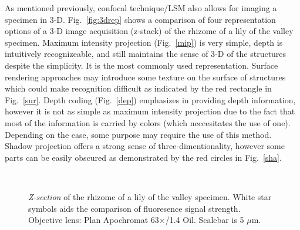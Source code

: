 As mentioned previously, confocal technique/LSM also allows for imaging a specimen in 3-D. 
Fig.~\ref{fig:3drep} shows a comparison of four representation options of a 3-D image acquisition (z-stack) of the rhizome of a lily of the valley specimen. 
Maximum intensity projection (Fig.~\ref{mip}) is very simple, depth is intuitively recognizeable, and still maintains the sense of 3-D of the structures despite the simplicity. 
It is the most commonly used representation. 
Surface rendering approaches may introduce some texture on the surface of structures which could make recognition difficult as indicated by the red rectangle in Fig.~\ref{sur}. 
Depth coding (Fig.~\ref{dep}) emphasizes in providing depth information, however it is not as simple as maximum intensity projection due to the fact that most of the information is carried by colors (which neccesitates the use of one). 
Depending on the case, some purpose may require the use of this method. Shadow projection offers a strong sense of three-dimentionality, however some parts can be easily obscured as demonstrated by the red circles in Fig.~\ref{sha}. 

\begin{figure}[h!]
\centering
{}\hspace{0.1em}
\hspace{0.1em}
\\
\caption{\textit{Z-section} of the rhizome of a lily of the valley specimen. 
White star symbols aids the comparison of fluoresence signal strength. 
Objective lens: Plan Apochromat 63$\times$/1.4 Oil. 
Scalebar is 5 $\mu$m.} 
\label{fig:zstep}
\end{figure}

